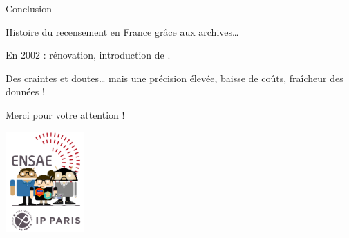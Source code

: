 \documentclass[10pt,xcolor=table,color={dvipsnames,usenames},ignorenonframetext,usepdftitle=false,french]{beamer}
\begin{document}
\begin{frame}{Conclusion}
\protect\hypertarget{conclusion}{}
\begin{center}\bcoeil\end{center}

Histoire du recensement en France grâce aux archives\ldots{}

\begin{center}\bcstop\end{center}

En 2002 : rénovation, introduction de .

\begin{center}\bcattention\end{center}

Des craintes et doutes\ldots{} mais une précision élevée, baisse de
coûts, fraîcheur des données !
\end{frame}

\begin{frame}[noframenumbering]{Merci pour votre attention !}
\protect\hypertarget{merci-pour-votre-attention}{}
\bigskip

\begin{center}
\includegraphics[width = 3cm]{img/LOGO-ENSAE.png}
\end{center}
\end{frame}
\end{document}
